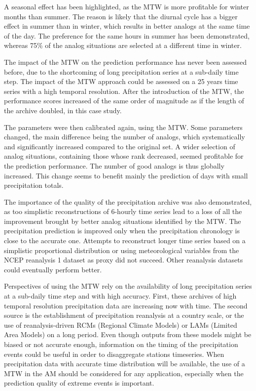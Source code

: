 \documentclass[hess, manuscript]{copernicus}
\begin{document}
A seasonal effect has been highlighted, as the MTW is more profitable for winter months than summer. The reason is likely that the diurnal cycle has a bigger effect in summer than in winter, which results in better analogs at the same time of the day. The preference for the same hours in summer has been demonstrated, whereas 75\% of the analog situations are selected at a different time in winter.

The impact of the MTW on the prediction performance has never been assessed before, due to the shortcoming of long precipitation series at a sub-daily time step. The impact of the MTW approach could be assessed on a 25 years time series with a high temporal resolution. After the introduction of the MTW, the performance scores increased of the same order of magnitude as if the length of the archive doubled, in this case study.

The parameters were then calibrated again, using the MTW. Some parameters changed, the main difference being the number of analogs, which systematically and significantly increased compared to the original set. A wider selection of analog situations, containing those whose rank decreased, seemed profitable for the prediction performance. The number of good analogs is thus globally increased. This change seems to benefit mainly the prediction of days with small precipitation totals.

The importance of the quality of the precipitation archive was also demonstrated, as too simplistic reconstructions of 6-hourly time series lead to a loss of all the improvement brought by better analog situations identified by the MTW. The precipitation prediction is improved only when the precipitation chronology is close to the accurate one. Attempts to reconstruct longer time series based on a simplistic proportional distribution or using meteorological variables from the NCEP reanalysis 1 dataset as proxy did not succeed. Other reanalysis datasets could eventually perform better.

Perspectives of using the MTW rely on the availability of long precipitation series at a sub-daily time step and with high accuracy. First, these archives of high temporal resolution precipitation data are increasing now with time. The second source is the establishment of precipitation reanalysis at a country scale, or the use of reanalysis-driven RCMs (Regional Climate Models) or LAMs (Limited Area Models) on a long period. Even though outputs from these models might be biased or not accurate enough, information on the timing of the precipitation events could be useful in order to disaggregate stations timeseries. When precipitation data with accurate time distribution will be available, the use of a MTW in the AM should be considered for any application, especially when the prediction quality of extreme events is important.
\end{document}
